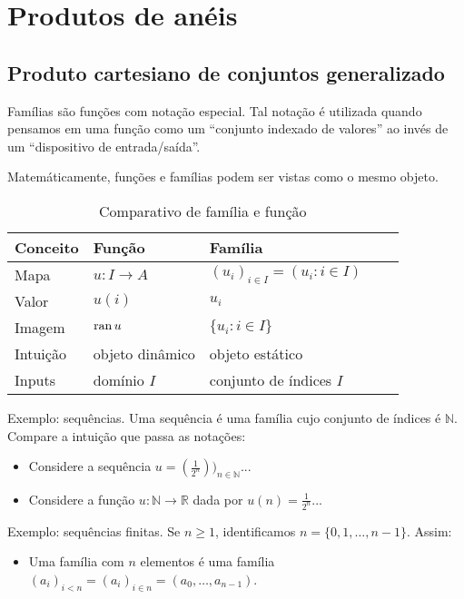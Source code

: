 \section{Produtos de anéis}
\subsection{Produto cartesiano de conjuntos generalizado}

Famílias são funções com notação especial. Tal notação é utilizada quando pensamos em uma função como um ``conjunto indexado de valores'' ao invés de um ``dispositivo de entrada/saída''.

Matemáticamente, funções e famílias podem ser vistas como o mesmo objeto.
\begin{table}[h]
    \centering
    \begin{tabular}{lllll}
        \hline
        \textbf{Conceito} & \textbf{Função} & \textbf{Família} \\ \hline
        Mapa & $u:I\rightarrow A$ & $(u_i)_{i \in I}=(u_i: i \in I)$ \\
        Valor & $u(i)$ & $u_i$ \\
        Imagem & $\operatorname{ran} u$ & $\{u_i: i \in I\}$\\
        Intuição & objeto dinâmico & objeto estático \\
        Inputs & domínio $I$ & conjunto de índices $I$ \\
        \hline
    \end{tabular}
    \caption{Comparativo de família e função}
\end{table}

Exemplo: sequências. Uma sequência é uma família cujo conjunto de índices é $\mathbb N$. Compare a intuição que passa as notações:
\begin{itemize}
\item Considere a sequência $u=(\frac{1}{2^n}))_{n \in \mathbb N}$...
\item Considere a função $u:\mathbb N\rightarrow \mathbb R$ dada por $u(n)=\frac{1}{2^n}$...
\end{itemize}

Exemplo: sequências finitas. Se $n\geq 1$, identificamos $n=\{0, 1, \dots, n-1\}$. Assim:
\begin{itemize}
\item Uma família com $n$ elementos é uma família $(a_i)_{i<n}=(a_i)_{i \in n}=(a_0, \dots, a_{n-1})$.
\end{itemize}

